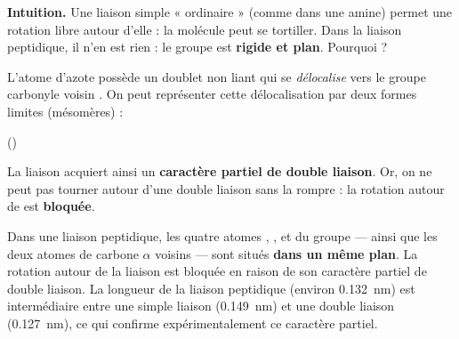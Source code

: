 \documentclass[11pt]{article}
\begin{document}
\textbf{Intuition.} Une liaison simple  « ordinaire » (comme dans une amine) permet une rotation libre autour d'elle : la molécule peut se tortiller. Dans la liaison peptidique, il n'en est rien : le groupe  est \textbf{rigide et plan}. Pourquoi ?

L'atome d'azote possède un doublet non liant qui se \emph{délocalise} vers le groupe carbonyle voisin . On peut représenter cette délocalisation par deux formes limites (mésomères) :

\begin{center}
\quad
\ce{<->}
\quad
{}
\quad
()
\end{center}

La liaison  acquiert ainsi un \textbf{caractère partiel de double liaison}. Or, on ne peut pas tourner autour d'une double liaison sans la rompre : la rotation autour de  est \textbf{bloquée}.

\begin{propriete}
Dans une liaison peptidique, les quatre atomes , ,  et  du groupe  — ainsi que les deux atomes de carbone $\alpha$ voisins — sont situés \textbf{dans un même plan}. La rotation autour de la liaison  est bloquée en raison de son caractère partiel de double liaison. La longueur de la liaison  peptidique (environ \SI{0,132}{nm}) est intermédiaire entre une simple liaison  (\SI{0,149}{nm}) et une double liaison  (\SI{0,127}{nm}), ce qui confirme expérimentalement ce caractère partiel.
\end{propriete}
\end{document}
